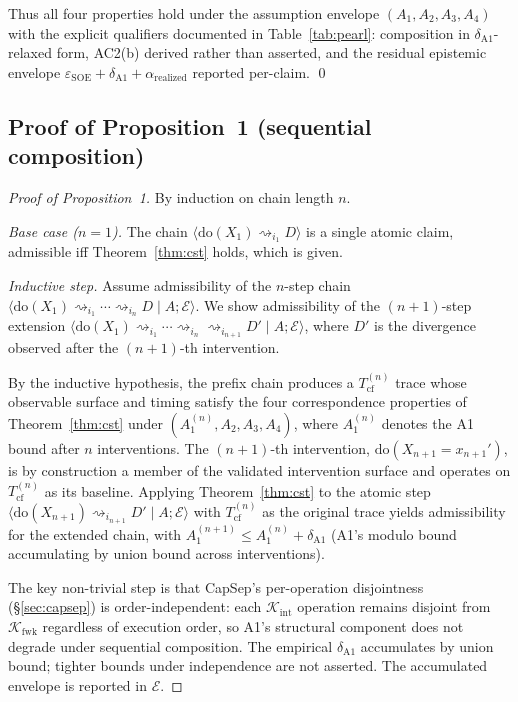 \documentclass[conference]{IEEEtran}
\newcommand{\Tcf}{T_\text{cf}}
\newcommand{\Kint}{\mathcal{K}_\text{int}}
\newcommand{\Kfwk}{\mathcal{K}_\text{fwk}}
\newcommand{\arealized}{\alpha_\text{realized}}
\newcommand{\epsSOE}{\varepsilon_\text{SOE}}
\begin{document}
Thus all four properties hold under the assumption envelope
$(A_1, A_2, A_3, A_4)$ with the explicit qualifiers documented in
Table~\ref{tab:pearl}: composition in $\delta_{\text{A1}}$-relaxed
form, AC2(b) derived rather than asserted, and the residual
epistemic envelope $\epsSOE + \delta_{\text{A1}} + \arealized$
reported per-claim. \qed

\subsection{Proof of Proposition~1 (sequential composition)}

\begin{proof}[Proof of Proposition~1]
By induction on chain length $n$.

\emph{Base case ($n{=}1$).} The chain
$\langle \text{do}(X_1) \rightsquigarrow_{i_1} D \rangle$ is a
single atomic claim, admissible iff Theorem~\ref{thm:cst} holds,
which is given.

\emph{Inductive step.} Assume admissibility of the
$n$-step chain
$\langle \text{do}(X_1) \rightsquigarrow_{i_1} \cdots
\rightsquigarrow_{i_n} D \mid A; \mathcal{E}\rangle$. We show
admissibility of the $(n{+}1)$-step extension
$\langle \text{do}(X_1) \rightsquigarrow_{i_1} \cdots
\rightsquigarrow_{i_n} \rightsquigarrow_{i_{n+1}} D' \mid A;
\mathcal{E}\rangle$, where $D'$ is the divergence observed after
the $(n{+}1)$-th intervention.

By the inductive hypothesis, the prefix chain produces a
$\Tcf^{(n)}$ trace whose observable surface and timing satisfy
the four correspondence properties of Theorem~\ref{thm:cst} under
$(A_1^{(n)}, A_2, A_3, A_4)$, where $A_1^{(n)}$ denotes the A1
bound after $n$ interventions. The $(n{+}1)$-th intervention,
$\text{do}(X_{n+1} = x_{n+1}')$, is by construction a member of the
validated intervention surface and operates on
$\Tcf^{(n)}$ as its baseline. Applying Theorem~\ref{thm:cst} to
the atomic step $\langle \text{do}(X_{n+1}) \rightsquigarrow_{i_{n+1}}
D' \mid A; \mathcal{E}\rangle$ with $\Tcf^{(n)}$ as the original
trace yields admissibility for the extended chain, with
$A_1^{(n+1)} \leq A_1^{(n)} + \delta_{\text{A1}}$ (A1's modulo
bound accumulating by union bound across interventions).

The key non-trivial step is that CapSep's per-operation
disjointness (\S\ref{sec:capsep}) is order-independent: each
$\Kint$ operation remains disjoint from $\Kfwk$ regardless of
execution order, so A1's structural component does not degrade
under sequential composition. The empirical $\delta_{\text{A1}}$
accumulates by union bound; tighter bounds under independence
are not asserted. The accumulated envelope is reported in
$\mathcal{E}$.


\end{proof}
\end{document}
